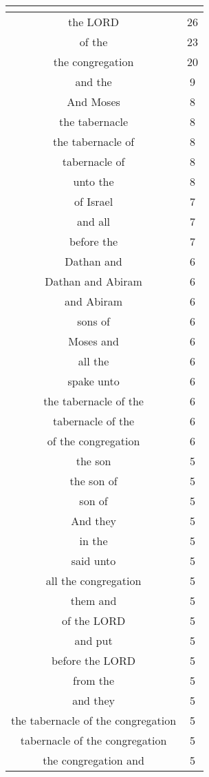 \begin{center}
\begin{longtable}{|c|c|}
\hline \multicolumn{2}{c}{{ }} \\ \hline
\endfoot 
the LORD & 26\\ \hline 
of the & 23\\ \hline 
the congregation & 20\\ \hline 
and the & 9\\ \hline 
And Moses & 8\\ \hline 
the tabernacle & 8\\ \hline 
the tabernacle of & 8\\ \hline 
tabernacle of & 8\\ \hline 
unto the & 8\\ \hline 
of Israel & 7\\ \hline 
and all & 7\\ \hline 
before the & 7\\ \hline 
Dathan and & 6\\ \hline 
Dathan and Abiram & 6\\ \hline 
and Abiram & 6\\ \hline 
sons of & 6\\ \hline 
Moses and & 6\\ \hline 
all the & 6\\ \hline 
spake unto & 6\\ \hline 
the tabernacle of the & 6\\ \hline 
tabernacle of the & 6\\ \hline 
of the congregation & 6\\ \hline 
the son & 5\\ \hline 
the son of & 5\\ \hline 
son of & 5\\ \hline 
And they & 5\\ \hline 
in the & 5\\ \hline 
said unto & 5\\ \hline 
all the congregation & 5\\ \hline 
them and & 5\\ \hline 
of the LORD & 5\\ \hline 
and put & 5\\ \hline 
before the LORD & 5\\ \hline 
from the & 5\\ \hline 
and they & 5\\ \hline 
the tabernacle of the congregation & 5\\ \hline 
tabernacle of the congregation & 5\\ \hline 
the congregation and & 5\\ \hline 

\end{longtable}
\end{center}
